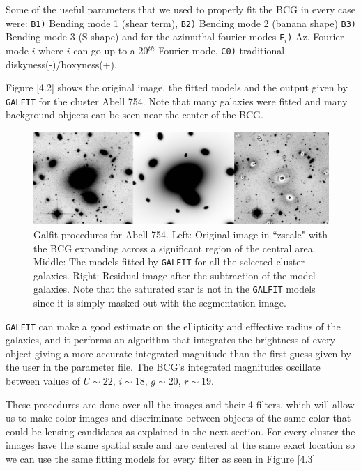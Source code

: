 Some of the useful parameters that we used to properly fit the BCG in every case were: \texttt{B1)} Bending mode 1 (shear term), \texttt{B2)} Bending mode 2 (banana shape)
\texttt{B3)} Bending mode 3 (S-shape) and for the azimuthal fourier modes
\texttt{F$_i$)} Az. Fourier mode $i$ where $i$ can go up to a 20$^{th}$ Fourier mode, \texttt{C0)}   traditional diskyness(-)/boxyness(+).

Figure [4.2] shows the original image, the fitted models and the output given by \texttt{GALFIT} for the cluster Abell 754. Note that many galaxies were fitted and many background objects can be seen near the center of the BCG. 

\begin{figure}[H]
\centering
\includegraphics[width=15cm]{images/galfit.png}
\caption[Galfit results for Abell 754]{Galfit procedures for Abell 754. Left: Original image in ``zscale" with the BCG expanding across a significant region of the central area. Middle: The models fitted by \texttt{GALFIT} for all the selected cluster galaxies. Right: Residual image after the subtraction of the model galaxies. Note that the saturated star is not in the \texttt{GALFIT} models since it is simply masked out with the segmentation image.}
\end{figure}

\texttt{GALFIT} can make a good estimate on the ellipticity and efffective radius of the galaxies, and it performs an algorithm that integrates the brightness of every object giving a more accurate integrated magnitude than the first guess given by the user in the parameter file. The BCG's integrated magnitudes oscillate between values of $U\sim 22$, $i\sim 18$, $g\sim 20$, $r\sim 19$.

These procedures are done over all the images and their 4 filters, which will allow us to make color images and discriminate between objects of the same color that could be lensing candidates as explained in the next section. For every cluster the images have the same spatial scale and are centered at the same exact location so we can use the same fitting models for every filter as seen in Figure [4.3]

